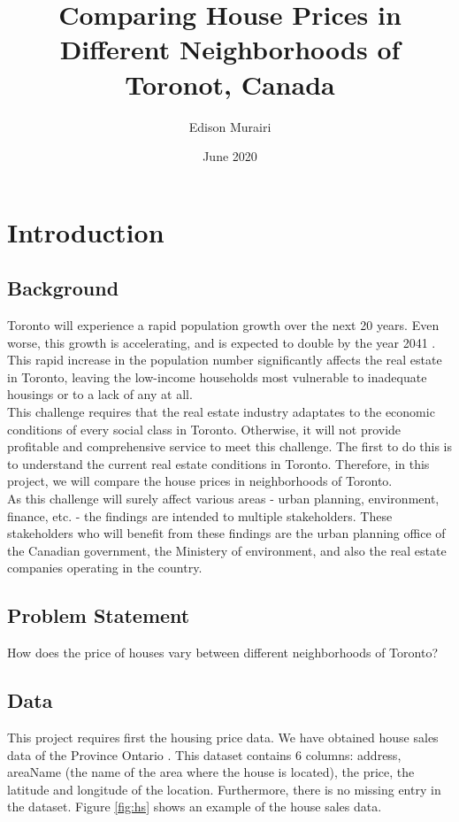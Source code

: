 \documentclass{article}
\title{Comparing House Prices in Different Neighborhoods of Toronot, Canada}
\author{Edison Murairi }
\date{June 2020}
\begin{document}
\maketitle

\section{Introduction}
\subsection{Background}
Toronto will experience a rapid population growth over the next 20 years. Even worse, this growth is accelerating, and is expected to double by the year 2041 \cite{toronto}. This rapid increase in the population number significantly affects the real estate in Toronto, leaving the low-income households most vulnerable to inadequate housings or to a lack of any at all. \\

This challenge requires that the real estate industry adaptates  to the economic conditions of every social class in Toronto. Otherwise, it will not provide profitable and comprehensive service to meet this challenge. The first to do this is to understand the current real estate conditions in Toronto. Therefore, in this project, we will compare the house prices in neighborhoods of Toronto. \\

As this challenge will surely affect various areas - urban planning, environment, finance, etc. - the findings are intended to multiple stakeholders. These stakeholders who will benefit from these findings are the urban planning office of the Canadian government, the Ministery of environment, and also the real estate companies operating in the country.

\subsection{Problem Statement}
How does the price of houses vary between different neighborhoods of Toronto?

\subsection{Data}
This project requires first the housing price data. We have obtained house sales data of the Province Ontario \cite{houses_sale}. This dataset contains 6 columns: address, areaName (the name of the area where the house is located), the price, the latitude and longitude of the location. Furthermore, there is no missing entry in the dataset. Figure \ref{fig:hs} shows an example of the house sales data.\\
\end{document}

